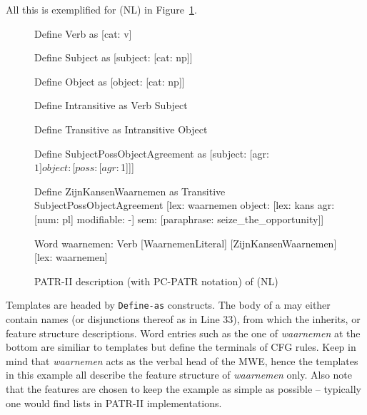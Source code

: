 \documentclass[output=paper
,modfonts
,nonflat
,biblatexbackend=biber
]{langsci/langscibook}
\begin{document}
All this is exemplified for (NL)  in Figure~\ref{lic:fig:patr:dutch}.
\begin{figure}[p]
  \begin{patr-listing}
Define Verb as
    [cat: v]

Define Subject as
    [subject: [cat: np]]

Define Object as
    [object: [cat: np]]
    
Define Intransitive as
    Verb
    Subject
    
Define Transitive as
    Intransitive
    Object

Define SubjectPossObjectAgreement as
    [subject: [agr: $1]
    object: [poss: [agr: $1]]]

Define ZijnKansenWaarnemen as
    Transitive
    SubjectPossObjectAgreement
    [lex: waarnemen
     object: [lex: kans
              agr: [num: pl]
              modifiable: -]
    sem: [paraphrase: seize_the_opportunity]]

Word waarnemen:
    Verb
    {[WaarnemenLiteral] [ZijnKansenWaarnemen]}
    [lex: waarnemen]
  \end{patr-listing}
  \caption{PATR-II description (with PC-PATR notation) of (NL) }
  \label{lic:fig:patr:dutch}
\end{figure}
Templates are headed by \texttt{Define-as} constructs. The body of a  may either contain  names (or disjunctions thereof as in Line 33), from which the  inherits, or feature structure descriptions. Word entries such as the one of \textit{waarnemen} at the bottom are similiar to templates but define the terminals of CFG rules. Keep in mind that \textit{waarnemen} acts as the verbal head of the MWE, hence the templates in this example all describe the feature structure of \textit{waarnemen} only. Also note that the features are chosen to keep the example as simple as possible -- typically one would find  lists in PATR-II implementations.
\end{document}
